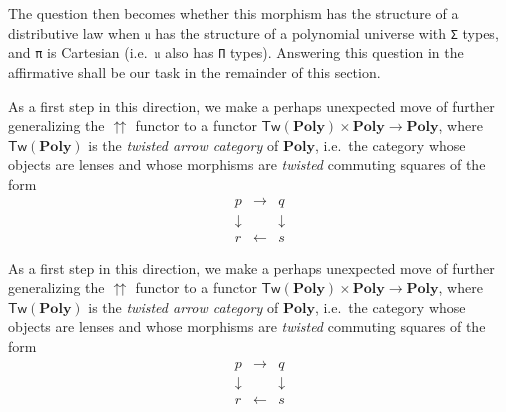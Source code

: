 \documentclass[
  11pt,
  oneside,
  article]{memoir}
\theoremstyle{definition}
\theoremstyle{plain}
\newcommand{\Cat}[1]{\mathbf{#1}}%
\newcommand{\poly}{\Cat{Poly}}
\newcommand{\0}{\textsf{0}}
\newcommand{\1}{\tn{\textsf{1}}}
\begin{document}
The question then becomes whether this morphism has the structure of a
distributive law when \texttt{𝔲} has the structure of a polynomial
universe with \texttt{Σ} types, and \texttt{π} is Cartesian
(i.e.~\texttt{𝔲} also has \texttt{Π} types). Answering this question in
the affirmative shall be our task in the remainder of this section.

As a first step in this direction, we make a perhaps unexpected move of
further generalizing the \(\upuparrows\) functor to a functor
\(\mathsf{Tw}(\poly) \times \poly \to \poly\),
where \(\mathsf{Tw}(\poly)\) is the \emph{twisted arrow
category} of \(\poly\), i.e.~the category whose objects are
lenses and whose morphisms are \emph{twisted} commuting squares of the
form \[
\begin{array}{ccc}
p & \to & q\\
\downarrow & & \downarrow\\
r & \leftarrow & s
\end{array}
\]

As a first step in this direction, we make a perhaps unexpected move of
further generalizing the \(\upuparrows\) functor to a functor
\(\mathsf{Tw}(\poly) \times \poly \to \poly\),
where \(\mathsf{Tw}(\poly)\) is the \emph{twisted arrow
category} of \(\poly\), i.e.~the category whose objects are
lenses and whose morphisms are \emph{twisted} commuting squares of the
form \[
\begin{array}{ccc}
p & \to & q\\
\downarrow & & \downarrow\\
r & \leftarrow & s
\end{array}
\]
\end{document}
